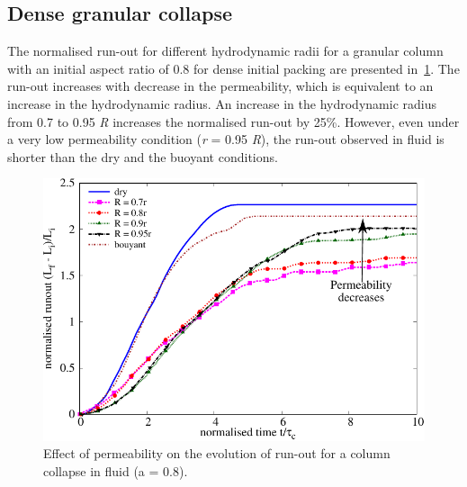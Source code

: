 \documentclass[12pt,a4paper,twocolumn,fleqn]{narms}
\begin{document}
\subsection{Dense granular collapse}
The normalised run-out for different hydrodynamic radii for a granular column 
with an initial aspect ratio of 0.8 for dense initial packing are presented 
in~\cref{fig:Runout_a08_dense}. The run-out increases with decrease in the 
permeability, which is equivalent to an increase in the hydrodynamic radius. 
An increase in the hydrodynamic radius from 0.7 to 0.95 \textit{R} increases 
the normalised run-out by 25\%. However, even under a very low permeability 
condition (\textit{r} = 0.95 \textit{R}), the run-out observed in fluid is 
shorter than the dry and the buoyant conditions. 

\begin{figure}[htpb]
\centering
\includegraphics[width=0.9\linewidth]{figs/Runout_a08_dense}
\caption{Effect of permeability on the evolution of run-out for a column 
collapse in fluid (a = 0.8).}
\label{fig:Runout_a08_dense}
\end{figure}
\end{document}
